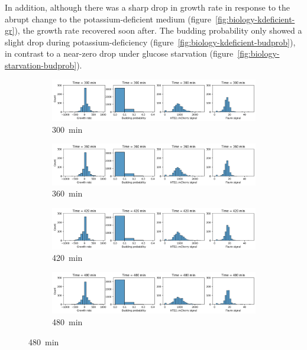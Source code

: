 In addition, although there was a sharp drop in growth rate in response to the abrupt change to the potassium-deficient medium (figure~\ref{fig:biology-kdeficient-gr}), the growth rate recovered soon after.
The budding probability only showed a slight drop during potassium-deficiency (figure~\ref{fig:biology-kdeficient-budprob}), in contrast to a near-zero drop under glucose starvation (figure~\ref{fig:biology-starvation-budprob}).


\begin{figure}
  \centering
  \begin{subfigure}[htpb]{0.9\textwidth}
   \centering
   \includegraphics[width=\textwidth]{613_distribs_0300}
   \caption{
     \SI{300}{\minute}
   }
   \label{fig:biology-kdeficient-distribs-0300}
  \end{subfigure}

  \begin{subfigure}[htpb]{0.9\textwidth}
   \centering
   \includegraphics[width=\textwidth]{613_distribs_0360}
   \caption{
     \SI{360}{\minute}
   }
   \label{fig:biology-kdeficient-distribs-0360}
  \end{subfigure}

  \begin{subfigure}[htpb]{0.9\textwidth}
   \centering
   \includegraphics[width=\textwidth]{613_distribs_0420}
   \caption{
     \SI{420}{\minute}
   }
   \label{fig:biology-kdeficient-distribs-0420}
  \end{subfigure}

  \begin{subfigure}[htpb]{0.9\textwidth}
   \centering
   \includegraphics[width=\textwidth]{613_distribs_0480}
   \caption{
     \SI{480}{\minute}
   }
   \label{fig:biology-kdeficient-distribs-0480}
  \end{subfigure}


\end{figure}
